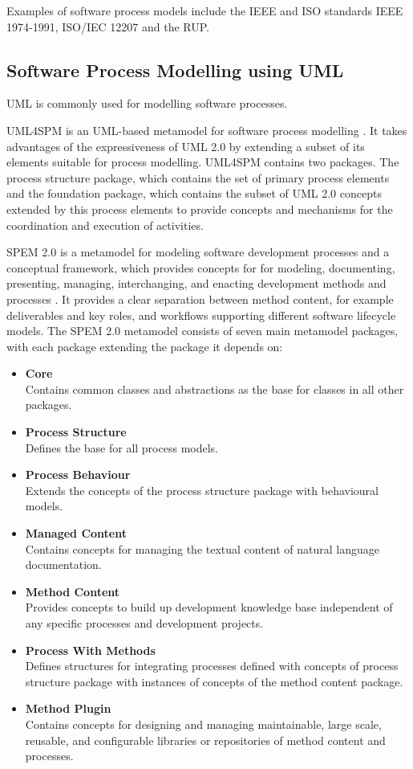 Examples of software process models include the IEEE and ISO standards IEEE 1974-1991, ISO/IEC 12207 and the \acf{RUP}.

\subsection{Software Process Modelling using \ac{UML}}
\ac{UML} is commonly used for modelling software processes. 

\ac{UML4SPM} is an \ac{UML}-based metamodel for software process modelling \citep{Bendraou:2005dv,Bendraou:2006aa}. It takes advantages of the expressiveness of \ac{UML} 2.0 by extending a subset of its elements suitable for process modelling. \ac{UML4SPM} contains two packages. The process structure package, which contains the set of primary process elements and the foundation package, which contains the subset of \ac{UML} 2.0 concepts extended by this process elements to provide concepts and mechanisms for the coordination and execution of activities.

\ac{SPEM} 2.0 is a metamodel for modeling software development processes and a conceptual framework, which provides concepts for for modeling, documenting, presenting, managing, interchanging, and enacting development methods and processes \citep{Group:2008aa}. It provides a clear separation between method content, for example deliverables and key roles, and workflows supporting different software lifecycle models. The \ac{SPEM} 2.0 metamodel consists of seven main metamodel packages, with each package extending the package it depends on:
\begin{itemize}
	\item \textbf{Core}\\
	Contains common classes and abstractions as the base for classes in all other packages.
	\item \textbf{Process Structure}\\
	Defines the base for all process models.
	\item \textbf{Process Behaviour}\\
	Extends the concepts of the process structure package with behavioural models.
	\item \textbf{Managed Content}\\
	Contains concepts for managing the textual content of natural language documentation.
	\item \textbf{Method Content}\\
	Provides concepts to build up development knowledge base independent of any specific processes and development projects.
	\item \textbf{Process With Methods}\\
	Defines structures for integrating processes defined with concepts of process structure package with instances of concepts of the method content package.
	\item \textbf{Method Plugin}\\
	Contains concepts for designing and managing maintainable, large scale, reusable, and configurable libraries or repositories of method content and processes.
\end{itemize}

